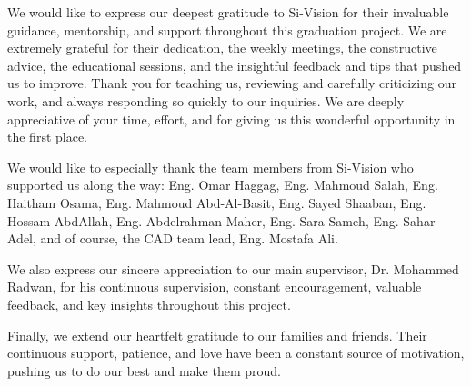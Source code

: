 We would like to express our deepest gratitude to Si-Vision for their invaluable guidance, mentorship, and support throughout this graduation project. We are extremely grateful for their dedication, the weekly meetings, the constructive advice, the educational sessions, and the insightful feedback and tips that pushed us to improve. Thank you for teaching us, reviewing and carefully criticizing our work, and always responding so quickly to our inquiries. We are deeply appreciative of your time, effort, and for giving us this wonderful opportunity in the first place.

We would like to especially thank the team members from Si-Vision who supported us along the way: Eng. Omar Haggag, Eng. Mahmoud Salah, Eng. Haitham Osama, Eng. Mahmoud Abd-Al-Basit, Eng. Sayed Shaaban, Eng. Hossam AbdAllah, Eng. Abdelrahman Maher, Eng. Sara Sameh, Eng. Sahar Adel, and of course, the CAD team lead, Eng. Mostafa Ali.

We also express our sincere appreciation to our main supervisor, Dr. Mohammed Radwan, for his continuous supervision, constant encouragement, valuable feedback, and key insights throughout this project.

Finally, we extend our heartfelt gratitude to our families and friends. Their continuous support, patience, and love have been a constant source of motivation, pushing us to do our best and make them proud.
